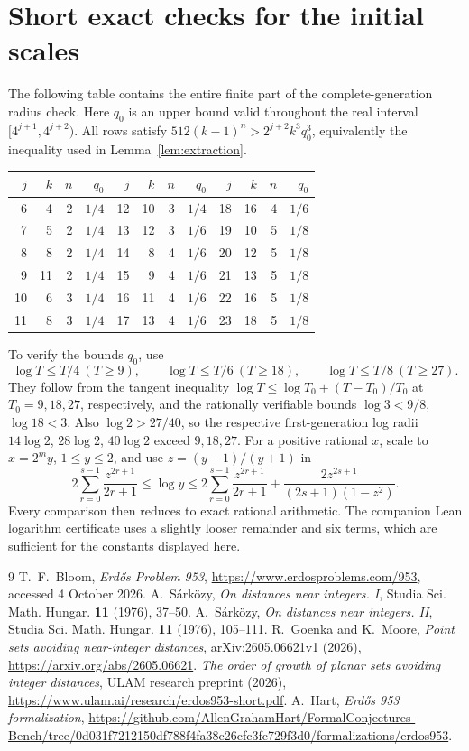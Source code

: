 \documentclass[11pt,a4paper]{article}
\theoremstyle{remark}\newtheorem{remark}[theorem]{Remark}
\begin{document}
\section{Short exact checks for the initial scales}\label{app:early}
The following table contains the entire finite part of the complete-generation
radius check. Here $q_0$ is an upper bound valid throughout the real interval
$[4^{j+1},4^{j+2})$. All rows satisfy
$512(k-1)^n>2^{j+2}k^3q_0^3$, equivalently the inequality used in
Lemma~\ref{lem:extraction}.
\begin{center}
\begin{tabular}{rrrr|rrrr|rrrr}
\toprule
$j$&$k$&$n$&$q_0$&$j$&$k$&$n$&$q_0$&$j$&$k$&$n$&$q_0$\\
\midrule
6&4&2&$1/4$&12&10&3&$1/4$&18&16&4&$1/6$\\
7&5&2&$1/4$&13&12&3&$1/6$&19&10&5&$1/8$\\
8&8&2&$1/4$&14&8&4&$1/6$&20&12&5&$1/8$\\
9&11&2&$1/4$&15&9&4&$1/6$&21&13&5&$1/8$\\
10&6&3&$1/4$&16&11&4&$1/6$&22&16&5&$1/8$\\
11&8&3&$1/4$&17&13&4&$1/6$&23&18&5&$1/8$\\
\bottomrule
\end{tabular}
\end{center}
To verify the bounds $q_0$, use
\[
 \log T\le T/4\ (T\ge9),\qquad
 \log T\le T/6\ (T\ge18),\qquad
 \log T\le T/8\ (T\ge27).
\]
They follow from the tangent inequality
$\log T\le\log T_0+(T-T_0)/T_0$ at $T_0=9,18,27$, respectively,
and the rationally verifiable bounds $\log3<9/8$, $\log18<3$.
Also $\log2>27/40$, so the respective first-generation log radii
$14\log2$, $28\log2$, $40\log2$ exceed $9,18,27$.
For a positive rational $x$, scale to $x=2^m y$, $1\le y\le2$, and use
$z=(y-1)/(y+1)$ in
\[
 2\sum_{r=0}^{s-1}\frac{z^{2r+1}}{2r+1}
 \le\log y\le
 2\sum_{r=0}^{s-1}\frac{z^{2r+1}}{2r+1}
 +\frac{2z^{2s+1}}{(2s+1)(1-z^2)}.
\]
Every comparison then reduces to exact rational arithmetic. The companion
Lean logarithm certificate uses a slightly looser remainder and six terms,
which are sufficient for the constants displayed here.

\clearpage
\begin{thebibliography}{9}
 T.~F.~Bloom, \emph{Erd\H{o}s Problem 953},
\url{https://www.erdosproblems.com/953}, accessed 4 October 2026.
 A.~S\'ark\"ozy, \emph{On distances near integers. I},
Studia Sci. Math. Hungar. \textbf{11} (1976), 37--50.
 A.~S\'ark\"ozy, \emph{On distances near integers. II},
Studia Sci. Math. Hungar. \textbf{11} (1976), 105--111.
 R.~Goenka and K.~Moore,
\emph{Point sets avoiding near-integer distances}, arXiv:2605.06621v1 (2026),
\url{https://arxiv.org/abs/2605.06621}.
 \emph{The order of growth of planar sets avoiding integer distances},
ULAM research preprint (2026),
\url{https://www.ulam.ai/research/erdos953-short.pdf}.
 A.~Hart, \emph{Erd\H{o}s 953 formalization},
\url{https://github.com/AllenGrahamHart/FormalConjectures-Bench/tree/0d031f7212150df788f4fa38c26cfc3fc729f3d0/formalizations/erdos953}.
\end{thebibliography}
\end{document}
